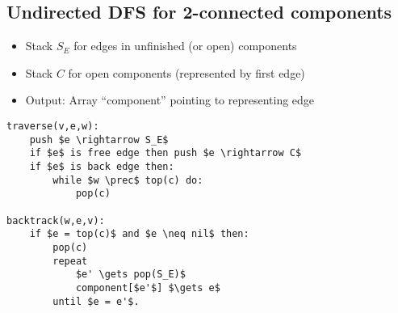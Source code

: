 \subsection{Undirected DFS for 2-connected components}

\begin{itemize}
\item Stack $S_E$ for edges in unfinished (or open) components
\item Stack $C$ for open components (represented by first edge)
\item Output: Array ``component'' pointing to representing edge
\end{itemize}

\begin{lstlisting}[mathescape]
traverse(v,e,w):
    push $e \rightarrow S_E$
    if $e$ is free edge then push $e \rightarrow C$
    if $e$ is back edge then:
        while $w \prec$ top(c) do:
            pop(c)

backtrack(w,e,v):
    if $e = top(c)$ and $e \neq nil$ then:
        pop(c)
        repeat
            $e' \gets pop(S_E)$
            component[$e'$] $\gets e$
        until $e = e'$.
\end{lstlisting}
